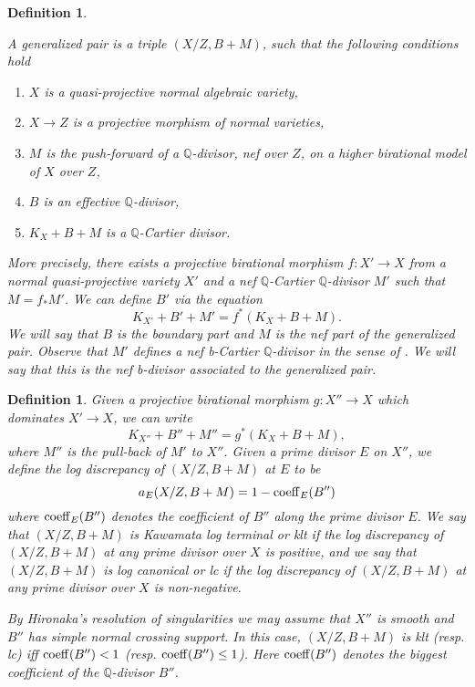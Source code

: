 \documentclass{amsart}
\renewcommand{\qq}{\mathbb{Q}}
\newtheorem{definition}[theorem]{Definition}
\theoremstyle{remark}
\numberwithin{equation}{section}
\begin{document}
\begin{definition}\label{d-glp}
{\em A {\em generalized pair} is a triple $(X/Z,B+M)$, such that the following conditions hold
\begin{enumerate}
\item $X$ is a quasi-projective normal algebraic variety,
\item $X\rightarrow Z$ is a projective morphism of normal varieties, 
\item $M$ is the push-forward of a $\qq$-divisor, nef over $Z$, on a higher birational model of $X$ over $Z$, 
\item $B$ is an effective $\qq$-divisor,
\item $K_X+B+M$ is a $\qq$-Cartier divisor.
\end{enumerate}
More precisely, there exists a projective birational morphism $f\colon X' \rightarrow X$ 
from a normal quasi-projective variety $X'$ and a nef $\qq$-Cartier $\qq$-divisor $M'$ such that $M=f_* M'$.
We can define $B'$ via the equation
\[
K_{X'}+B'+M'= f^*(K_X+B+M).	
\]
We will say that $B$ is the {\em boundary part}
and $M$ is the {\em nef part} of the generalized pair.
Observe that $M'$ defines a nef b-Cartier $\qq$-divisor in the sense of \cite[Definition 1.7.3]{Cor07}.
We will say that this is the {\em nef b-divisor  associated to the generalized pair}.}
\end{definition}

\begin{definition}
{\em Given a projective birational morphism 
$g\colon X''\rightarrow X$ which dominates $X'\rightarrow X$, 
we can write 
\[
K_{X''}+B''+M''= g^*(K_X+B+M),
\]
where $M''$ is the pull-back of $M'$ to $X''$.
Given a prime divisor $E$ on $X''$, we define the {\em log discrepancy} of $(X/Z,B+M)$
at $E$ to be 
\[
a_E(X/Z,B+M)= 1-{\rm coeff}_E(B'')
\]
where ${\rm coeff}_E(B'')$ denotes the coefficient of $B''$ along the prime divisor $E$.
We say that $(X/Z,B+M)$ is 
{\em Kawamata log terminal} or {\em klt} 
if the log discrepancy of $(X/Z,B+M)$ at any prime divisor over $X$ is positive,
and we say that $(X/Z,B+M)$ is 
{\em log canonical} or {\em lc}
if the log discrepancy of $(X/Z,B+M)$ at any prime divisor over $X$ is non-negative. 

By Hironaka's resolution of singularities we may assume that $X''$ is smooth and $B''$ has simple normal crossing support.
In this case, $(X/Z,B+M)$ is klt (resp. lc) iff ${\rm coeff}(B'')<1$ (resp. ${\rm coeff}(B'')\leq 1$). Here ${\rm coeff}(B'')$ denotes the biggest coefficient of the $\qq$-divisor $B''$.
}
\end{definition}
\end{document}

